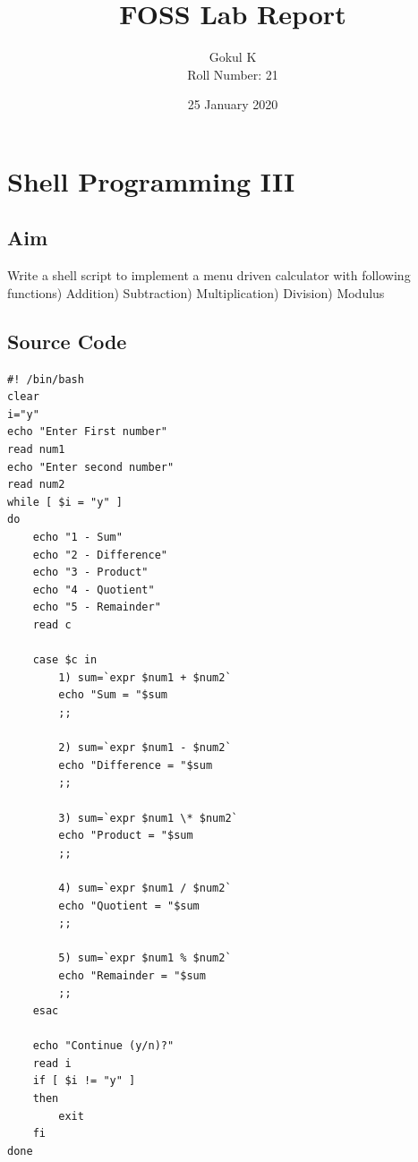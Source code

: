 \documentclass{article}
\begin{document}
\title{FOSS Lab Report}
\author{Gokul K\\[2\baselineskip]
Roll Number: 21\\[2\baselineskip]}
\date{25 January 2020}

\maketitle

\setcounter{section}{5}
\section{Shell Programming III}
\subsection{Aim}
Write a shell script to implement a menu driven calculator with following functions) Addition) Subtraction) Multiplication) Division) Modulus\newline
\subsection{Source Code}
\begin{verbatim}
#! /bin/bash
clear
i="y"
echo "Enter First number"
read num1
echo "Enter second number"
read num2
while [ $i = "y" ]
do
	echo "1 - Sum"
	echo "2 - Difference"
	echo "3 - Product"
	echo "4 - Quotient"
	echo "5 - Remainder"
	read c

	case $c in
		1) sum=`expr $num1 + $num2`
		echo "Sum = "$sum
		;;

		2) sum=`expr $num1 - $num2`
		echo "Difference = "$sum
		;;

		3) sum=`expr $num1 \* $num2`
		echo "Product = "$sum
		;;

		4) sum=`expr $num1 / $num2`
		echo "Quotient = "$sum
		;;

		5) sum=`expr $num1 % $num2`
		echo "Remainder = "$sum
		;;
	esac

	echo "Continue (y/n)?"
	read i
	if [ $i != "y" ]
	then
		exit
	fi
done
\end{verbatim}
\end{document}
